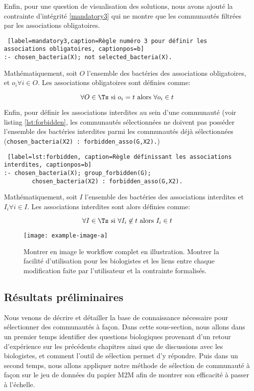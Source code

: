 \documentclass[../main.tex]{subfiles}
\begin{document}
Enfin, pour une question de visualisation des solutions, nous avons ajouté la contrainte d'intégrité \ref{mandatory3} qui ne montre que les communautés filtrées par les associations obligatoires.

\begin{lstlisting} [label=mandatory3,caption=Règle numéro 3 pour définir les associations obligatoires, captionpos=b]
:- chosen_bacteria(X); not selected_bacteria(X).
\end{lstlisting}

Mathématiquement, soit $O$ l'ensemble des bactéries des associations obligatoires, et $o_i \forall i \in O$. Les associations obligatoires sont définies comme:

\[
\forall O \in \Ts \text{ si } o_i = t \text{ alors } \forall o_i \in t 
\]

Enfin, pour définir les associations interdites au sein d'une communauté (voir listing \ref{lst:forbidden}, les communautés sélectionnées ne doivent pas posséder l'ensemble des bactéries interdites parmi les communautés déjà sélectionnées (\texttt{chosen\_bacteria(X2) : forbidden\_asso(G,X2).})

\begin{lstlisting} [label=lst:forbidden, caption=Règle définissant les associations interdites, captionpos=b]
:- chosen_bacteria(X); group_forbidden(G);
		chosen_bacteria(X2) : forbidden_asso(G,X2).
\end{lstlisting}

Mathématiquement, soit $I$ l'ensemble des bactéries des associations interdites et $I_i \forall i \in I$. Les associations interdites sont alors définies comme:

\[
\forall I \in \Ts \text{ si } \forall I_i \not \in t \text{ alors } I_i \in t 
\]

\begin{figure}[h!]
    \centering
    \texttt{[image: example-image-a]}
    \caption{Montrer en image le workflow complet en illustration. Montrer la facilité d'utilisation pour les biologistes et les liens entre chaque modification faite par l'utilisateur et la contrainte formalisés.}
    \label{fig:my_label}
\end{figure}
\newpage

\subsection{Résultats préliminaires}
Nous venons de décrire et détailler la base de connaissance nécessaire pour sélectionner des communautés à façon. Dans cette sous-section, nous allons dans un premier temps identifier des questions biologiques provenant d'un retour d'expérience sur les précédents chapitres ainsi que de discussions avec les biologistes, et comment l'outil de sélection permet d'y répondre. Puis dans un second temps, nous allons appliquer notre méthode de sélection de communauté à façon sur le jeu de données du papier M2M \citep{Belcour.2020} afin de montrer son efficacité à passer à l'échelle.
\end{document}
